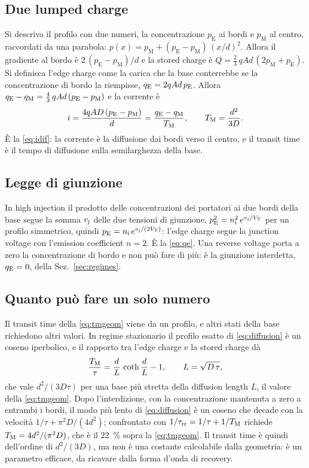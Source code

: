 \documentclass[10pt,a4paper]{scrartcl}
\let\newcommand\lmitdefine
\newcommand{\taurr}{\tau_\mathrm{rr}}
\newcommand{\TM}{T_\mathrm{M}}
\newcommand{\qE}{q_\mathrm{E}}
\newcommand{\qM}{q_\mathrm{M}}
\newcommand{\vj}{v_\mathrm{j}}
\newcommand{\VT}{V_\mathrm{T}}
\begin{document}
\subsection*{Due lumped charge}
Si descriva il profilo con due numeri, la concentrazione $p_\mathrm{E}$ ai bordi e $p_\mathrm{M}$ al centro, raccordati da una parabola: $p(x) = p_\mathrm{M} + (p_\mathrm{E}-p_\mathrm{M})\,(x/d)^2$. Allora il gradiente al bordo è $2\,(p_\mathrm{E}-p_\mathrm{M})/d$ e la stored charge è $Q = \tfrac{2}{3}\,qAd\,(2p_\mathrm{M}+p_\mathrm{E})$. Si definisca l'edge charge come la carica che la base conterrebbe se la concentrazione di bordo la riempisse, $\qE = 2qAd\,p_\mathrm{E}$. Allora $\qE - \qM = \tfrac43\,qAd\,(p_\mathrm{E}-p_\mathrm{M})$ e la corrente è
\begin{equation}
i = \frac{4qAD\,(p_\mathrm{E}-p_\mathrm{M})}{d} = \frac{\qE-\qM}{\TM} , \qquad \TM = \frac{d^2}{3D} .
\label{eq:tmgeom}
\end{equation}
È la \eqref{eq:idif}: la corrente è la diffusione dai bordi verso il centro, e il transit time è il tempo di diffusione sulla semilarghezza della base.

\subsection*{Legge di giunzione}
In high injection il prodotto delle concentrazioni dei portatori ai due bordi della base segue la somma $\vj$ delle due tensioni di giunzione, $p_\mathrm{E}^2 = n_\mathrm{i}^2\,e^{\vj/\VT}$ per un profilo simmetrico, quindi $p_\mathrm{E} = n_\mathrm{i}\,e^{\vj/(2\VT)}$: l'edge charge segue la junction voltage con l'emission coefficient $n = 2$. È la \eqref{eq:qe}. Una reverse voltage porta a zero la concentrazione di bordo e non può fare di più: è la giunzione interdetta, $\qE = 0$, della Sez.~\ref{sec:regimes}.

\subsection*{Quanto può fare un solo numero}
Il transit time della \eqref{eq:tmgeom} viene da un profilo, e altri stati della base richiedono altri valori. In regime stazionario il profilo esatto di \eqref{eq:diffusion} è un coseno iperbolico, e il rapporto tra l'edge charge e la stored charge dà
\begin{equation}
\frac{\TM}{\tau} = \frac{d}{L}\,\coth\frac{d}{L} - 1 , \qquad L = \sqrt{D\,\tau} ,
\label{eq:tmstatic}
\end{equation}
che vale $d^2/(3D\tau)$ per una base più stretta della diffusion length $L$, il valore della \eqref{eq:tmgeom}. Dopo l'interdizione, con la concentrazione mantenuta a zero a entrambi i bordi, il modo più lento di \eqref{eq:diffusion} è un coseno che decade con la velocità $1/\tau + \pi^2 D/(4d^2)$; confrontato con $1/\taurr = 1/\tau + 1/\TM$ richiede $\TM = 4d^2/(\pi^2 D)$, che è il \SI{22}{\percent} sopra la \eqref{eq:tmgeom}. Il transit time è quindi dell'ordine di $d^2/(3D)$, ma non è una costante calcolabile dalla geometria: è un parametro efficace, da ricavare dalla forma d'onda di recovery.
\end{document}

